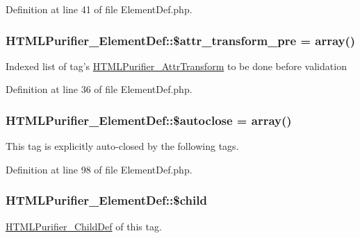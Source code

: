 Definition at line 41 of file Element\+Def.\+php.

\hypertarget{classHTMLPurifier__ElementDef_a8673e6a9b4eb86ebacdcc44a4eba2cad}{
\subsubsection[{\$attr\+\_\+transform\+\_\+pre}]{\setlength{\rightskip}{0pt plus 5cm}H\+T\+M\+L\+Purifier\+\_\+\+Element\+Def\+::\$attr\+\_\+transform\+\_\+pre = array()}}\label{classHTMLPurifier__ElementDef_a8673e6a9b4eb86ebacdcc44a4eba2cad}
Indexed list of tag's \hyperlink{classHTMLPurifier__AttrTransform}{H\+T\+M\+L\+Purifier\+\_\+\+Attr\+Transform} to be done before validation 

Definition at line 36 of file Element\+Def.\+php.

\hypertarget{classHTMLPurifier__ElementDef_a19729d4c2d69e9864a148d0a6b390a36}{
\subsubsection[{\$autoclose}]{\setlength{\rightskip}{0pt plus 5cm}H\+T\+M\+L\+Purifier\+\_\+\+Element\+Def\+::\$autoclose = array()}}\label{classHTMLPurifier__ElementDef_a19729d4c2d69e9864a148d0a6b390a36}
This tag is explicitly auto-\/closed by the following tags. 

Definition at line 98 of file Element\+Def.\+php.

\hypertarget{classHTMLPurifier__ElementDef_ac00a01850d99ecacc0245d6ceba13a9b}{
\subsubsection[{\$child}]{\setlength{\rightskip}{0pt plus 5cm}H\+T\+M\+L\+Purifier\+\_\+\+Element\+Def\+::\$child}}\label{classHTMLPurifier__ElementDef_ac00a01850d99ecacc0245d6ceba13a9b}
\hyperlink{classHTMLPurifier__ChildDef}{H\+T\+M\+L\+Purifier\+\_\+\+Child\+Def} of this tag. 

